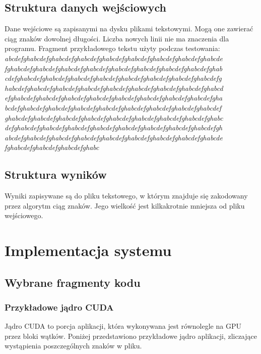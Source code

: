 \documentclass[12pt,a4paper,titlepage]{article}
\begin{document}
\subsection{Struktura danych wejściowych}
Dane wejściowe są zapisanymi na dysku plikami tekstowymi. Mogą one zawierać ciąg znaków dowolnej długości. Liczba nowych linii nie ma znaczenia dla programu.
\newline\newline
Fragment przykładowego tekstu użyty podczas testowania:\newline\newline
\textsl{
abcdefghabcdefghabcdefghabcdefghabcdefghabcdefghabcdefghabcdefghabcde
fghabcdefghabcdefghabcdefghabcdefghabcdefghabcdefghabcdefghabcdefghab
cdefghabcdefghabcdefghabcdefghabcdefghabcdefghabcdefghabcdefghabcdefg
habcdefghabcdefghabcdefghabcdefghabcdefghabcdefghabcdefghabcdefghabcd
efghabcdefghabcdefghabcdefghabcdefghabcdefghabcdefghabcdefghabcdefgha
bcdefghabcdefghabcdefghabcdefghabcdefghabcdefghabcdefghabcdefghabcdef
ghabcdefghabcdefghabcdefghabcdefghabcdefghabcdefghabcdefghabcdefghabc
defghabcdefghabcdefghabcdefghabcdefghabcdefghabcdefghabcdefghabcdefgh
abcdefghabcdefghabcdefghabcdefghabcdefghabcdefghabcdefghabcdefghabcde
fghabcdefghabcdefghabcdefghabc
}

\subsection{Struktura wyników}
Wyniki zapisywane są do pliku tekstowego, w którym znajduje się zakodowany przez algorytm ciąg znaków. Jego wielkość jest kilkakrotnie mniejsza od pliku wejściowego.

\newpage
\section{Implementacja systemu}
\subsection{Wybrane fragmenty kodu}

\subsubsection{Przykładowe jądro CUDA}
Jądro CUDA to porcja aplikacji, która wykonywana jest równolegle na GPU przez bloki wątków. Poniżej przedstawiono przykładowe jądro aplikacji, zliczające wystąpienia poszczególnych znaków w pliku.
\end{document}
